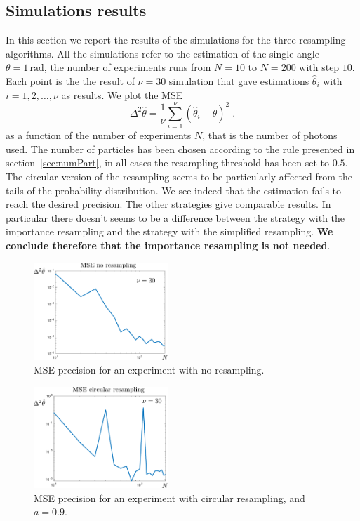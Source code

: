 \documentclass[aps, pra, 10pt, twocolumn, superscriptaddress,floatfix]{revtex4-1}
\begin{document}
\subsection{Simulations results}
%
In this section we report the results of the simulations for the three resampling algorithms. All the simulations refer to the estimation of the single angle $\theta = 1 \, \text{rad}$, the number of experiments runs from $N = 10$ to $N = 200$ with step $10$. Each point is the the result of $\nu = 30$ simulation that gave estimations $\hat{\theta}_i$ with $i = 1, 2, \dots, \nu$ as results. We plot the MSE
%
\begin{equation}
	\Delta^2 \hat{\theta} = \frac{1}{\nu} \sum_{i=1}^\nu (\hat{\theta}_i - \theta)^2 \; .
\end{equation}
%
as a function of the number of experiments $N$, that is the number of photons used. The number of particles has been chosen according to the rule presented in section~\ref{sec:numPart}, in all cases the resampling threshold has been set to $0.5$. The circular version of the resampling seems to be particularly affected from the tails of the probability distribution. We see indeed that the estimation fails to reach the desired precision. The other strategies give comparable results. In particular there doesn't seems to be a difference between the strategy with the importance resampling and the strategy with the simplified resampling. \textbf{We conclude therefore that the importance resampling is not needed}.
%
\begin{figure}[!t]
	\begin{center}
		\includegraphics[width=0.45\textwidth]{immagini/noResampling.pdf}
	\end{center}
	\caption{MSE precision for an experiment with no resampling.}
	\label{fig:noResampling}
\end{figure}
%
\begin{figure}[!t]
	\begin{center}
		\includegraphics[width=0.45\textwidth]{immagini/circularResampling.pdf}
	\end{center}
	\caption{MSE precision for an experiment with circular resampling, and $a = 0.9$.}
	\label{fig:ircularResampling}
\end{figure}
\end{document}
